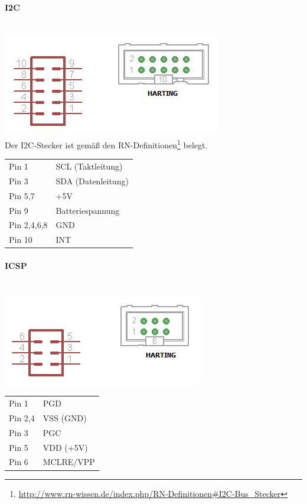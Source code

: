 \documentclass[a4paper,10pt]{article}
\begin{document}
\paragraph{I2C} \mbox{} \\

\includegraphics[scale=0.6]{connector_i2c} \\
Der I2C-Stecker ist gemäß den RN-Definitionen\footnote{\url{http://www.rn-wissen.de/index.php/RN-Definitionen\#I2C-Bus_Stecker}} belegt.
\begin{center}
    \begin{tabular}{| l | l |}
    \hline
    Pin 1 	& SCL (Taktleitung) \\ 
    Pin 3	& SDA (Datenleitung) \\
    Pin 5,7 	& +5V \\ 
    Pin 9 	& Batteriespannung \\ 
    Pin 2,4,6,8	& GND \\
    Pin 10 	& INT \\ \hline
    \end{tabular}
\end{center}

\paragraph{ICSP} \mbox{} \\

\includegraphics[scale=0.6]{connector_icsp} 
\begin{center}
    \begin{tabular}{| l | l |}
    \hline
    Pin 1 	& PGD \\ 
    Pin 2,4	& VSS (GND) \\
    Pin 3 	& PGC \\ 
    Pin 5 	& VDD (+5V) \\ 
    Pin 6	& MCLRE/VPP \\ \hline
    \end{tabular}
\end{center}
\end{document}
